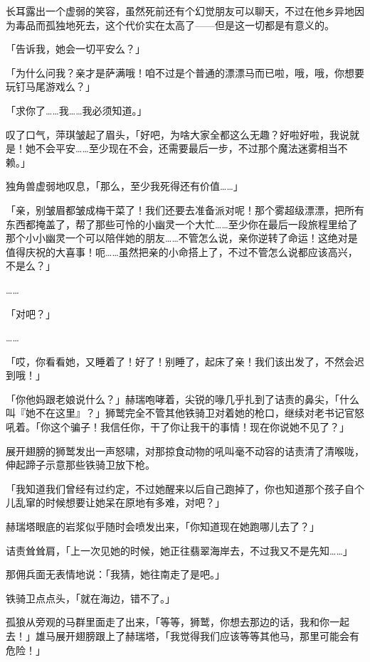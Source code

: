 长耳露出一个虚弱的笑容，虽然死前还有个幻觉朋友可以聊天，不过在他乡异地因为毒品而孤独地死去，这个代价实在太高了——但是这一切都是有意义的。

「告诉我，她会一切平安么？」

「为什么问我？亲才是萨满哦！咱不过是个普通的漂漂马而已啦，哦，哦，你想要玩钉马尾游戏么？」

「求你了……我……我必须知道。」

叹了口气，萍琪皱起了眉头，「好吧，为啥大家全都这么无趣？好啦好啦，我说就是！她不会平安……至少现在不会，还需要最后一步，不过那个魔法迷雾相当不赖。」

独角兽虚弱地叹息，「那么，至少我死得还有价值……」

「亲，别皱眉都皱成梅干菜了！我们还要去准备派对呢！那个雾超级漂漂，把所有东西都掩盖了，帮了那些可怜的小幽灵一个大忙……至少你在最后一段旅程里给了那个小小幽灵一个可以陪伴她的朋友……不管怎么说，亲你逆转了命运！这绝对是值得庆祝的大喜事！呃……虽然把亲的小命搭上了，不过不管怎么说都应该高兴，不是么？」

……{}

「对吧？」

……{}

「哎，你看看她，又睡着了！好了！别睡了，起床了亲！我们该出发了，不然会迟到哦！」

\horizonline


「你他妈跟老娘说什么？」赫瑞咆哮着，尖锐的喙几乎扎到了诘责的鼻尖，「什么叫『她不在这里』？」狮鹫完全不管其他铁骑卫对着她的枪口，继续对老书记官怒吼着。「你这个骗子！我信任你，干了你让我干的事情！现在你说她不见了？」

展开翅膀的狮鹫发出一声怒啸，对那掠食动物的吼叫毫不动容的诘责清了清喉咙，伸起蹄子示意那些铁骑卫放下枪。

「我知道我们曾经有过约定，不过她醒来以后自己跑掉了，你也知道那个孩子自个儿乱窜的时候想要让她呆在原地有多难，对吧？」

赫瑞塔眼底的岩浆似乎随时会喷发出来，「你知道现在她跑哪儿去了？」

诘责耸耸肩，「上一次见她的时候，她正往翡翠海岸去，不过我又不是先知……」

那佣兵面无表情地说：「我猜，她往南走了是吧。」

铁骑卫点点头，「就在海边，错不了。」

孤狼从旁观的马群里面走了出来，「等等，狮鹫，你想去那边的话，我和你一起去！」雄马展开翅膀跟上了赫瑞塔，「我觉得我们应该等等其他马，那里可能会有危险！」


